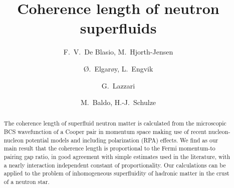 

\title{Coherence length of neutron superfluids}

\author{F.\ V.\ De Blasio, M.\ Hjorth-Jensen}

\address{NORDITA, Blegdamsvej 17, DK-2100 Copenhagen \O, Denmark}

\author{\O.\ Elgar\o y, L.\ Engvik}

\address{Department of Physics, University of Oslo, N-0316 Oslo, Norway}

\author{G.\ Lazzari}

\address{European Centre for Theoretical Studies 
         in Nuclear Physics and Related Areas, Trento, Italy}

\author{M.\ Baldo, H.-J.\ Schulze}

\address{Dipartimento di Fisica,
         Universit\`a di Catania and I.N.F.N., Sezione di Catania, 
         corso Italia 57, I-95129 Catania, Italy}

\maketitle
 
\begin{abstract}

The coherence length of superfluid neutron matter 
is calculated  from the microscopic BCS wavefunction of a Cooper  
pair in momentum space making use of recent nucleon-nucleon
potential models and including polarization (RPA) effects. 
We find as our main result that the coherence length is proportional to 
the Fermi momentum-to pairing gap ratio, in good agreement with 
simple  estimates used in the literature, with a nearly 
interaction independent constant of proportionality. 
Our calculations can be applied to  the problem of inhomogeneous superfluidity 
of hadronic matter in the crust of a neutron star.
 
\end{abstract}

